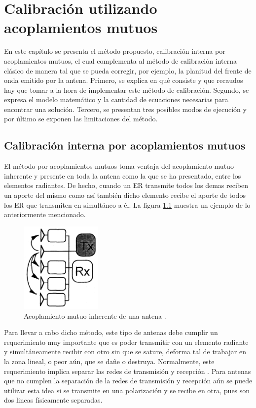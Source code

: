 \chapter{Calibración utilizando acoplamientos mutuos}
\label{ch:mutualCalibration}

En este capítulo se presenta el método propuesto, calibración interna por acoplamientos mutuos, el cual complementa al método de
calibración interna clásico de manera tal que se pueda corregir, por ejemplo, la planitud del frente de onda emitido por la
antena. Primero, se explica en qué consiste y que recaudos hay que tomar a la hora de implementar este método de calibración.
Segundo, se expresa el modelo matemático y la cantidad de ecuaciones necesarias para encontrar una solución. Tercero, se
presentan tres posibles modos de ejecución y por último se exponen las limitaciones del método.  


\section{Calibración interna por acoplamientos mutuos}

El método por acoplamientos mutuos toma ventaja del acoplamiento mutuo inherente y presente en toda la antena como la que se ha
presentado, entre los elementos radiantes. De hecho, cuando un ER transmite todos los demas reciben un aporte del mismo como así
también dicho elemento recibe el aporte de todos los ER que transmiten en simultáneo a él. La figura \ref{fig:mutualCoupling1}
muestra un ejemplo de lo anteriormente mencionado.

\begin{figure}[H]
 \centering
 \includegraphics[width=4cm]{gfx/mutualCoupling1.png}
 \caption{Acoplamiento mutuo inherente de una antena \cite{Hara1997}.}
 \label{fig:mutualCoupling1}
\end{figure}

Para llevar a cabo dicho método, este tipo de antenas debe cumplir un requerimiento muy importante que es poder transmitir con
un elemento radiante y simultáneamente recibir con otro sin que se sature, deforma tal de trabajar en la zona lineal, o peor
aún, que se dañe o destruya. Normalmente, este requerimiento implica separar las redes de transmisión y recepción
\cite{Gao2001}. Para antenas que no cumplen la separación de la redes de transmisión y recepción aún se puede utilizar esta
idea si se transmite en una polarización y se recibe en otra, pues son dos lineas físicamente separadas.

